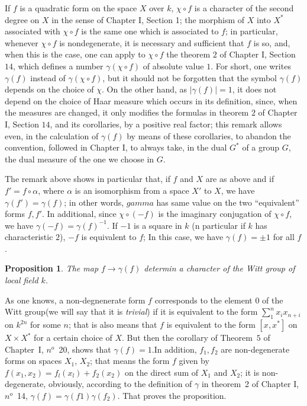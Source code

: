 \documentclass[12pt]{amsart}
\newtheorem{prop}{Proposition}
\newcounter{ssection}
\renewcommand{\subsection}{
  \addtocounter{ssection}{1}{\bf  \arabic{ssection}.\  }}
\begin{document}
If $f$ is a quadratic form on the space $X$ over $k$, $\chi\circ f$
is a character of the second degree on $X$ in the sense of Chapter
I, Section 1; the morphism of $X$ into $X^{*}$ associated with $\chi\circ f$
is the same one which is associated to $f$; in particular, whenever
$\chi\circ f$ is nondegenerate, it is necessary and sufficient that
$f$ is so, and, when this is the case, one can apply to $\chi\circ f$
the theorem $2$ of Chapter I, Section $14$, which defines a number
$\gamma(\chi\circ f)$ of absolute value $1$. For short, one writes
$\gamma(f)$ instead of $\gamma(\chi\circ f)$, but it should not
be forgotten that the symbol $\gamma(f)$ depends on the choice of
$\chi$. On the other hand, as $|\gamma(f)|=1$, it does not depend
on the choice of Haar measure which occurs in its definition, since,
when the measures are changed, it only modifies the formulas in theorem
$2$ of Chapter I, Section $14$, and its corollaries, by a positive
real factor; this remark allows even, in the calculation of $\gamma(f)$
by means of these corollaries, to abandon the convention, followed
in Chapter I, to always take, in the dual $G^{*}$ of a group $G$,
the dual measure of the one we choose in $G$.



\subsection{}
The remark above shows in particular that,
 if $f$ and $X$ are as above and if $f'=f\circ \alpha$, 
where $\alpha$ is an isomorphism from a space $X'$ to $X$,
we have $\gamma(f')=\gamma(f)$;
in other words, $gamma$ has same value on the two ``equivalent'' forms
$f,f'$.
In additional, since $\chi\circ(-f)$ is the imaginary conjugation of 
$\chi\circ f$, we have $\gamma(-f)=\gamma(f)^{-1}$. 
If $-1$ is a square in $k$ (n particular if $k$ has characteristic $2$),
$-f$ is equivalent to $f$; 
In this case, we have $\gamma(f) = \pm 1$ for all $f$.

\begin{prop}\label{p:3}
The map $f\to \gamma(f)$ determin a character of the Witt group of local field
$k$.
\end{prop} 
As one knows, a non-degnenerate form $f$ corresponds to the element $0$
of the Witt group(we will say that it is {\it trivial})
if it is equivalent to the form $\sum_1^n x_i x_{n+i}$ on $k^{2n}$ 
for some $n$; that is also means 
that $f$ is equivalent to the form $[x, x^*]$ on $X\times X^*$ 
for a certain choice of $X$.
But then the corollary of Theorem~$5$ of Chapter~I, $n^o$~20,
shows that $\gamma(f)=1$.In addition, $f_1,f_2$
are  non-degenerate forms on spaces $X_1$, $X_2$;
that means the form $f$ given by  $f(x_1, x_2) = f_l (x_l) +f_2 (x_2)$
 on the direct sum of $X_1$ and $X_2$; it is non-degenerate, obviously, 
according to the definition of $\gamma$ in theorem~2 of Chapter I, $n^o$~14,
 $\gamma(f) =\gamma(f1)\gamma(f_2)$. 
That proves the proposition.  
\end{document}
